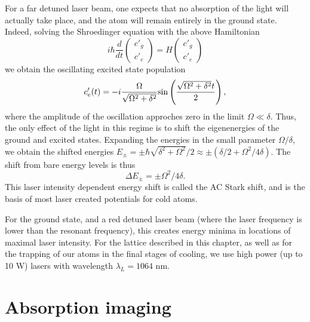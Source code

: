 	For a far detuned laser beam, one expects that no absorption of the light will actually take place, and the atom will remain entirely in the ground state. Indeed, solving the Shroedinger equation with the above Hamiltonian
\begin{equation}
i\hbar \frac{d}{dt} \begin{pmatrix} c'_g \\ c'_e \end{pmatrix} = H \begin{pmatrix} c'_g \\ c'_e \end{pmatrix}
\end{equation}
we obtain the oscillating excited state population 
\begin{equation}
c'_e(t) = -i \frac{\Omega}{\sqrt{\Omega^2 + \delta^2}}{\rm sin}\left(\frac{\sqrt{\Omega^2 + \delta^2}t}{2}\right),
\end{equation}
where the amplitude of the oscillation approches zero in the limit $\Omega \ll \delta$. Thus, the only effect of the light in this regime is to shift the eigenenergies of the ground and excited states. Expanding the energies in the small parameter $\Omega/\delta$, we obtain the shifted energies $E_{\pm} = \pm \hbar \sqrt{\delta^2 + \Omega^2}/2 \approx \pm (\delta/2 + \Omega^2/4\delta)$. The shift from bare energy levels is thus 
\begin{equation}
\Delta E_{\pm} = \pm \Omega^2/4\delta.
\end{equation}
This laser intensity dependent energy shift is called the AC Stark shift, and is the basis of most laser created potentials for cold atoms. 
	
	For the ground state, and a red detuned laser beam (where the laser frequency is lower than the resonant frequency), this creates energy minima in locations of maximal laser intensity. For the lattice described in this chapter, as well as for the trapping of our atoms in the final stages of cooling, we use high power (up to 10 W) lasers with wavelength $\lambda_L = 1064 $ nm. 

\section{Absorption imaging}\label{sec:absorptionImaging}

